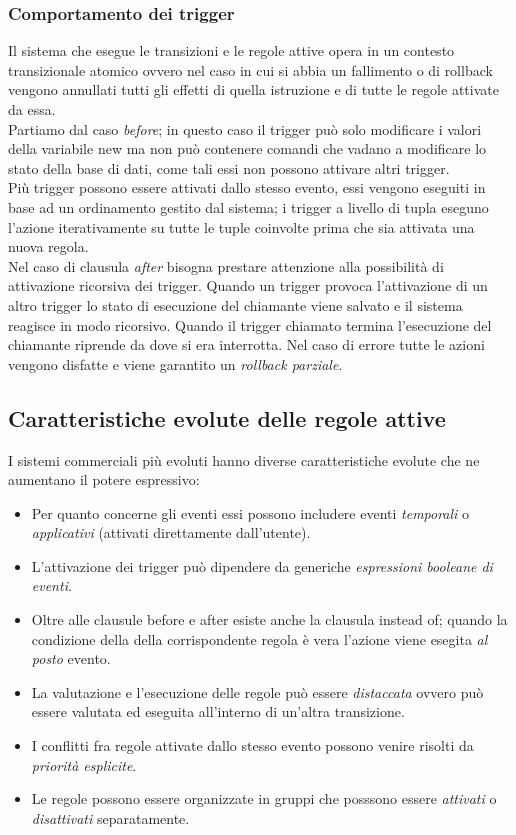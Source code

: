 \subsubsection{Comportamento dei trigger}
Il sistema che esegue le transizioni e le regole attive opera in un contesto transizionale atomico ovvero nel caso in cui si abbia un fallimento o di rollback vengono annullati tutti gli effetti di quella istruzione e di tutte le regole attivate da essa.\\
Partiamo dal caso \emph{before}; in questo caso il trigger può solo modificare i valori della variabile \textsf{new} ma non può contenere comandi che vadano a modificare lo stato della base di dati, come tali essi non possono attivare altri trigger.\\
Più trigger possono essere attivati dallo stesso evento, essi vengono eseguiti in base ad un ordinamento gestito dal sistema; i trigger a livello di tupla eseguno l'azione iterativamente su tutte le tuple coinvolte prima che sia attivata una nuova regola.\\
Nel caso di clausula \emph{after} bisogna prestare attenzione alla possibilità di attivazione ricorsiva dei trigger. Quando un trigger provoca l'attivazione di un altro trigger lo stato di esecuzione del chiamante viene salvato e il sistema reagisce in modo ricorsivo. Quando il trigger chiamato termina l'esecuzione del chiamante riprende da dove si era interrotta. Nel caso di errore tutte le azioni vengono disfatte e viene garantito un \emph{rollback parziale}.
\subsection{Caratteristiche evolute delle regole attive}
I sistemi commerciali più evoluti hanno diverse caratteristiche evolute che ne aumentano il potere espressivo:
\begin{itemize}
\item Per quanto concerne gli eventi essi possono includere eventi \emph{temporali} o \emph{applicativi} (attivati direttamente dall'utente).
\item L'attivazione dei trigger può dipendere da generiche \emph{espressioni booleane di eventi}.
\item Oltre alle clausule \textsf{before} e \textsf{after} esiste anche la clausula \textsf{instead of}; quando la condizione della della corrispondente regola è vera l'azione viene esegita \emph{al posto} evento.
\item La valutazione e l'esecuzione delle regole può essere \emph{distaccata} ovvero può essere valutata ed eseguita all'interno di un'altra transizione.
\item I conflitti fra regole attivate dallo stesso evento possono venire risolti da \emph{priorità esplicite}.
\item Le regole possono essere organizzate in gruppi che posssono essere \emph{attivati} o \emph{disattivati} separatamente.
\end{itemize}

